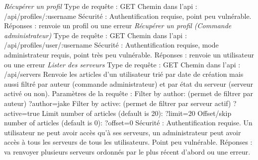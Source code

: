 \documentclass{article}
\begin{document}
\newpage
\textit{Récupérer un profil}
\newline
Type de requête : GET
\newline
Chemin dans l'api : /api/profiles/:username
\newline
Sécurité : Authentification requise, point peu vulnérable.
\newline
Réponses : renvoie un profil ou une erreur
\newline
\newline
\textit{Récupérer un profil (Commande administrateur)}
\newline
Type de requête : GET
\newline
Chemin dans l'api : /api/profiles/user/:username
\newline
Sécurité : Authentification requise, mode administrateur requis, point très peu vulnérable.
\newline
Réponses : renvoie un utilisateur ou une erreur
\newline
\newline
\textit{Lister des serveurs}
\newline
Type de requête : GET
\newline
Chemin dans l'api : /api/servers
\newline
Renvoie les articles d'un utilisateur trié par date de création mais aussi filtré par auteur (commande administrateur) et par état du serveur (serveur activé ou non).
\newline
Paramètres de la requête :
\newline
Filter by author: (permet de filtrer par auteur)
\newline
?author=jake
\newline
Filter by active: (permet de filtrer par serveur actif)
\newline
?active=true
\newline
Limit number of articles (default is 20):
\newline
?limit=20
\newline
Offset/skip number of articles (default is 0):
\newline
?offset=0
\newline
Sécurité : Authentification requise. Un utilisateur ne peut avoir accès qu'à ses serveurs, un administrateur peut avoir accès à tous les serveurs de tous les utilisateurs. Point peu vulnérable.
\newline
Réponses : va renvoyer plusieurs serveurs ordonnés par le plus récent d'abord ou une erreur.
\newline
\end{document}
